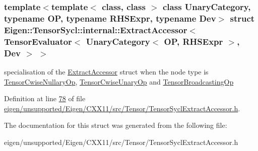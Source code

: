 \subsubsection*{template$<$template$<$ class, class $>$ class Unary\+Category, typename OP, typename R\+H\+S\+Expr, typename Dev$>$\newline
struct Eigen\+::\+Tensor\+Sycl\+::internal\+::\+Extract\+Accessor$<$ Tensor\+Evaluator$<$ Unary\+Category$<$ O\+P, R\+H\+S\+Expr $>$, Dev $>$ $>$}

specialisation of the \hyperlink{struct_eigen_1_1_tensor_sycl_1_1internal_1_1_extract_accessor}{Extract\+Accessor} struct when the node type is \hyperlink{class_eigen_1_1_tensor_cwise_nullary_op}{Tensor\+Cwise\+Nullary\+Op}, \hyperlink{class_eigen_1_1_tensor_cwise_unary_op}{Tensor\+Cwise\+Unary\+Op} and \hyperlink{class_eigen_1_1_tensor_broadcasting_op}{Tensor\+Broadcasting\+Op} 

Definition at line \hyperlink{eigen_2unsupported_2_eigen_2_c_x_x11_2src_2_tensor_2_tensor_sycl_extract_accessor_8h_source_l00078}{78} of file \hyperlink{eigen_2unsupported_2_eigen_2_c_x_x11_2src_2_tensor_2_tensor_sycl_extract_accessor_8h_source}{eigen/unsupported/\+Eigen/\+C\+X\+X11/src/\+Tensor/\+Tensor\+Sycl\+Extract\+Accessor.\+h}.



The documentation for this struct was generated from the following file\+:\begin{DoxyCompactItemize}
\item 
eigen/unsupported/\+Eigen/\+C\+X\+X11/src/\+Tensor/\+Tensor\+Sycl\+Extract\+Accessor.\+h\end{DoxyCompactItemize}
